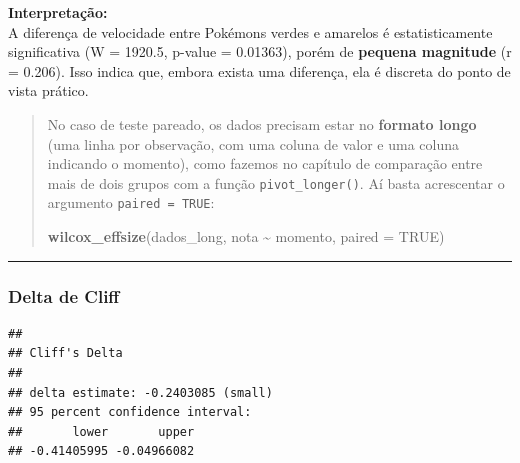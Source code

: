 \documentclass[
]{book}
\newenvironment{Shaded}{\begin{snugshade}}{\end{snugshade}}
\newcommand{\AttributeTok}[1]{\textcolor[rgb]{0.13,0.29,0.53}{#1}}
\newcommand{\CommentTok}[1]{\textcolor[rgb]{0.56,0.35,0.01}{\textit{#1}}}
\newcommand{\ConstantTok}[1]{\textcolor[rgb]{0.56,0.35,0.01}{#1}}
\newcommand{\FunctionTok}[1]{\textcolor[rgb]{0.13,0.29,0.53}{\textbf{#1}}}
\newcommand{\NormalTok}[1]{#1}
\newcommand{\SpecialCharTok}[1]{\textcolor[rgb]{0.81,0.36,0.00}{\textbf{#1}}}
\begin{document}
\textbf{Interpretação:}\\
A diferença de velocidade entre Pokémons verdes e amarelos é estatisticamente significativa (W = 1920.5, p-value = 0.01363), porém de \textbf{pequena magnitude} (r = 0.206). Isso indica que, embora exista uma diferença, ela é discreta do ponto de vista prático.

\begin{quote}
No caso de teste pareado, os dados precisam estar no \textbf{formato longo} (uma linha por observação, com uma coluna de valor e uma coluna indicando o momento), como fazemos no capítulo de comparação entre mais de dois grupos com a função \texttt{pivot\_longer()}. Aí basta acrescentar o argumento \texttt{paired\ =\ TRUE}:

\begin{Shaded}
\begin{Highlighting}[]
\FunctionTok{wilcox\_effsize}\NormalTok{(dados\_long, nota }\SpecialCharTok{\textasciitilde{}}\NormalTok{ momento, }\AttributeTok{paired =} \ConstantTok{TRUE}\NormalTok{)}
\end{Highlighting}
\end{Shaded}
\end{quote}

\begin{center}\rule{0.5\linewidth}{0.5pt}\end{center}

\subsubsection{Delta de Cliff}\label{delta-de-cliff}

\begin{Shaded}
\end{Shaded}

\begin{verbatim}
## 
## Cliff's Delta
## 
## delta estimate: -0.2403085 (small)
## 95 percent confidence interval:
##       lower       upper 
## -0.41405995 -0.04966082
\end{verbatim}
\end{document}
